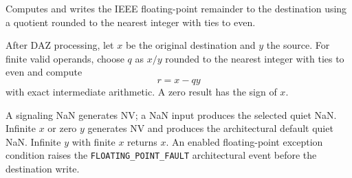 Computes and writes the IEEE floating-point remainder to the destination using a quotient rounded to the nearest integer with ties to even.

After DAZ processing, let \(x\) be the original destination and \(y\) the source. For finite valid operands, choose \(q\) as \(x/y\) rounded to the nearest integer with ties to even and compute
\[
  r = x - qy
\]
with exact intermediate arithmetic. A zero result has the sign of \(x\).

A signaling NaN generates NV; a NaN input produces the selected quiet NaN. Infinite \(x\) or zero \(y\) generates NV and produces the architectural default quiet NaN. Infinite \(y\) with finite \(x\) returns \(x\). An enabled floating-point exception condition raises the \texttt{FLOATING\_POINT\_FAULT} architectural event before the destination write.
